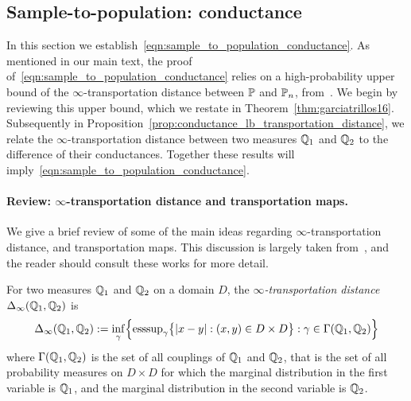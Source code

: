 \subsection{Sample-to-population: conductance}
\label{subsec:sample_to_population_conductance}

In this section we establish~\eqref{eqn:sample_to_population_conductance}. As mentioned in our main text, the proof of~\eqref{eqn:sample_to_population_conductance} relies on a high-probability upper bound of the $\infty$-transportation distance between $\mathbb{P}$ and $\mathbb{P}_n$, from~\citep{garciatrillos16b}. We begin by reviewing this upper bound, which we restate in Theorem~\ref{thm:garciatrillos16}. Subsequently in Proposition~\ref{prop:conductance_lb_transportation_distance}, we relate the $\infty$-transportation distance between two measures $\mathbb{Q}_1$ and $\mathbb{Q}_2$ to the difference of their conductances. Together these results will imply~\eqref{eqn:sample_to_population_conductance}.

\paragraph{Review: $\infty$-transportation distance and transportation maps.}
We give a brief review of some of the main ideas regarding $\infty$-transportation distance, and transportation maps. This discussion is largely taken from~\citep{garciatrillos16b,garciatrillos16}, and the reader should consult these works for more detail. 

For two measures $\mathbb{Q}_1$ and $\mathbb{Q}_2$ on a domain $D$, the \emph{$\infty$-transportation distance} $\Delta_{\infty}(\mathbb{Q}_1,\mathbb{Q}_2)$ is
\begin{equation*}
\Delta_{\infty}(\mathbb{Q}_1,\mathbb{Q}_2) := \inf_{\gamma}\Bigl\{\mathrm{esssup}_{\gamma} \bigl\{|x - y|: (x,y) \in D \times D\bigr\}: \gamma \in \Gamma(\mathbb{Q}_1,\mathbb{Q}_2) \Bigr\}
\end{equation*}
where $\Gamma(\mathbb{Q}_1,\mathbb{Q}_2)$ is the set of all couplings of $\mathbb{Q}_1$ and $\mathbb{Q}_2$, that is the set of all probability measures on $D \times D$ for which the marginal distribution in the first variable is $\mathbb{Q}_1$, and the marginal distribution in the second variable is $\mathbb{Q}_2$. 

